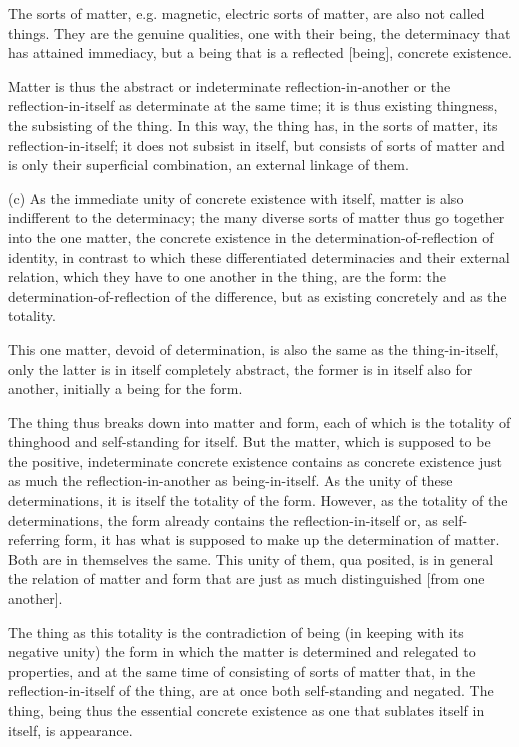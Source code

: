     The sorts of matter, e.g. magnetic, electric sorts of matter, are also
    not called things. They are the genuine qualities, one with their being,
    the determinacy that has attained immediacy,
    but a being that is a reflected [being], concrete existence.

Matter is thus the abstract or indeterminate reflection-in-another or
the reflection-in-itself as determinate at the same time;
it is thus existing thingness, the subsisting of the thing.
In this way, the thing has, in the sorts of matter,
its reflection-in-itself;
it does not subsist in itself, but consists of sorts of matter and
is only their superficial combination, an external linkage of them.

(c) As the immediate unity of concrete existence with itself,
matter is also indifferent to the determinacy;
the many diverse sorts of matter thus go together into
the one matter, the concrete existence in
the determination-of-reflection of identity,
in contrast to which these differentiated determinacies and
their external relation, which they have to one another in the thing,
are the form:
the determination-of-reflection of the difference,
but as existing concretely and as the totality.

    This one matter, devoid of determination, is also the same as
    the thing-in-itself, only the latter is in itself completely abstract,
    the former is in itself also for another, initially a being for the form.

The thing thus breaks down into matter and form,
each of which is the totality of thinghood and
self-standing for itself.
But the matter, which is supposed to be the positive,
indeterminate concrete existence contains as concrete existence
just as much the reflection-in-another as being-in-itself.
As the unity of these determinations,
it is itself the totality of the form.
However, as the totality of the determinations,
the form already contains the reflection-in-itself or,
as self-referring form, it has what is supposed to
make up the determination of matter.
Both are in themselves the same.
This unity of them, qua posited, is in general
the relation of matter and form that are
just as much distinguished [from one another].

The thing as this totality is the contradiction of being
(in keeping with its negative unity)
the form in which the matter is determined and relegated to properties, and
at the same time of consisting of sorts of matter that,
in the reflection-in-itself of the thing, are
at once both self-standing and negated.
The thing, being thus the essential concrete existence
as one that sublates itself in itself, is appearance.

